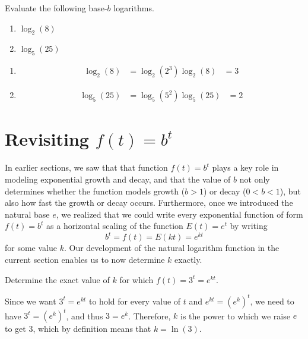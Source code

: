 \documentclass[nooutcomes]{ximera}
\begin{document}
\begin{example} Evaluate the following base-$b$ logarithms.
\begin{enumerate}
\item $\log_{2}(8)$
\item $\log_{5}(25)$
\end{enumerate}
\begin{explanation}
\begin{enumerate}
\item 
\begin{align*}
\log_{2}(8)&=\log_{2}(2^3)
\log_{2}(8)&= 3
\end{align*}

\item
\begin{align*} 
\log_{5}(25)&=\log_{5}(5^2)
\log_{5}(25) & = 2
\end{align*}

\end{enumerate}
\end{explanation}
\end{example}

%
%
%
\section{Revisiting $f(t) = b^t$}

In earlier sections, we saw that that function \(f(t) = b^t\) plays a key role in modeling exponential growth and decay, and that the value of \(b\) not only determines whether the function models growth (\(b \gt 1\)) or decay (\(0 \lt b \lt 1\)), but also how fast the growth or decay occurs.  Furthermore, once we introduced the natural base \(e\), we realized that we could write every exponential function of form \(f(t) = b^t\) as a horizontal scaling of the function \(E(t) = e^t\) by writing%
\begin{equation*}
b^t = f(t) = E(kt) = e^{kt}
\end{equation*}
for some value \(k\).  Our development of the natural logarithm function in the current section enables us to now determine \(k\) exactly.%
\begin{example}

Determine the exact value of \(k\) for which \(f(t) = 3^t = e^{kt}\).%

\begin{explanation} Since we want \(3^t = e^{kt}\) to hold for every value of \(t\) and \(e^{kt} = (e^k)^t\), we need to have \(3^t = (e^k)^t\), and thus \(3 = e^k\).  Therefore, \(k\) is the power to which we raise \(e\) to get \(3\), which by definition means that \(k = \ln(3)\).%
\end{explanation}
\end{example}
\end{document}
